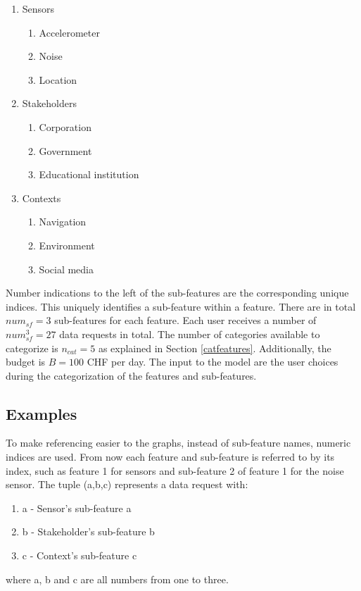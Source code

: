 \begin{enumerate}
    \item Sensors
    \begin{enumerate}
    \item Accelerometer 
    \item Noise 
    \item Location 
   \end{enumerate}
    \item Stakeholders 
    \begin{enumerate}
    \item Corporation 
    \item Government 
    \item Educational institution 
   \end{enumerate}
   \item Contexts
    \begin{enumerate}
    \item Navigation 
    \item Environment 
    \item Social media 
   \end{enumerate}
 \end{enumerate}
 
Number indications to the left of the sub-features are the corresponding unique indices. This uniquely identifies a sub-feature within a feature. There are in total $num_{sf}=3$ sub-features for each feature.
Each user receives a number of $num_{sf}^3=27$ data requests in total. The number of categories available to categorize is $n_{cat}=5$ as explained in Section \ref{catfeatures}. Additionally, the budget is $B=100$ CHF per day. 
The input to the model are the user choices during the categorization of the features and sub-features.

\subsection{Examples}

To make referencing easier to the graphs, instead of sub-feature names, numeric indices are used. From now each feature and sub-feature is referred to by its index, such as feature 1 for sensors and sub-feature 2 of feature 1 for the noise sensor. The tuple (a,b,c) represents a data request with:
\begin{enumerate}
    \item a - Sensor's sub-feature a
    \item b - Stakeholder's sub-feature b
    \item c - Context's sub-feature c
   \end{enumerate}
where a, b and c are all numbers from one to three. 


